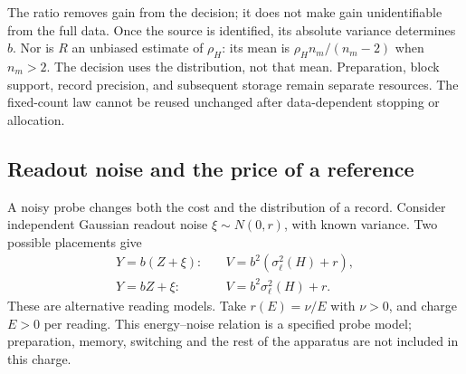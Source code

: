 \documentclass[12pt,a4paper]{article}
\begin{document}
The ratio removes gain from the decision; it does not make gain
unidentifiable from the full data. Once the source is identified,
its absolute variance determines $b$. Nor is $R$ an unbiased estimate
of $\rho_H$: its mean is
$\rho_H n_m/(n_m-2)$ when $n_m>2$.
The decision uses the distribution, not that mean.
Preparation, block support, record precision, and subsequent storage
remain separate resources. The fixed-count law cannot be reused
unchanged after data-dependent stopping or allocation.

\subsection{Readout noise and the price of a reference}
\label{subsec:noise}

A noisy probe changes both the cost and the distribution of a record.
Consider independent Gaussian readout noise $\xi\sim N(0,r)$,
with known variance. Two possible placements give
\begin{align}
 Y=b(Z+\xi):&\quad V=b^2(\sigma_\ell^2(H)+r),\label{eq:noise-in}\\
 Y=bZ+\xi:&\quad V=b^2\sigma_\ell^2(H)+r.\label{eq:noise-out}
\end{align}
These are alternative reading models. Take $r(E)=\nu/E$ with
$\nu>0$, and charge $E>0$ per reading. This energy--noise relation
is a specified probe model; preparation, memory, switching and the
rest of the apparatus are not included in this charge.
\end{document}
